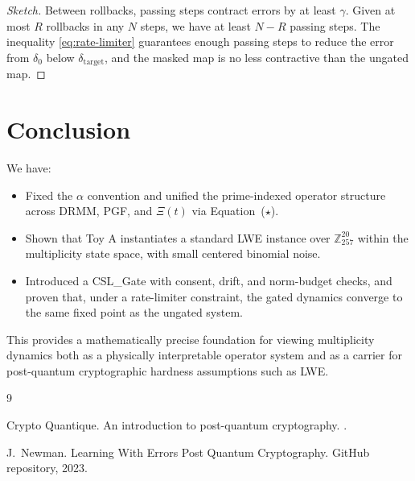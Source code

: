 \documentclass[11pt]{article}
\begin{document}
\begin{proof}[Sketch]
Between rollbacks, passing steps contract errors by at least $\gamma$. Given at
most $R$ rollbacks in any $N$ steps, we have at least $N-R$ passing steps. The
inequality \eqref{eq:rate-limiter} guarantees enough passing steps to reduce
the error from $\delta_0$ below $\delta_{\mathrm{target}}$, and the masked map
is no less contractive than the ungated map.
\end{proof}

\section{Conclusion}

We have:

\begin{itemize}
    \item Fixed the $\alpha$ convention and unified the prime-indexed operator
    structure across DRMM, PGF, and $\Xi(t)$ via Equation~($\star$).
    \item Shown that Toy A instantiates a standard LWE instance over
    $\mathbb{Z}_{257}^{20}$ within the multiplicity state space, with small
    centered binomial noise.
    \item Introduced a CSL\_Gate with consent, drift, and norm-budget checks,
    and proven that, under a rate-limiter constraint, the gated dynamics converge
    to the same fixed point as the ungated system.
\end{itemize}

This provides a mathematically precise foundation for viewing multiplicity
dynamics both as a physically interpretable operator system and as a carrier
for post-quantum cryptographic hardness assumptions such as LWE.


\begin{thebibliography}{9}

Crypto Quantique.
\newblock An introduction to post-quantum cryptography.
.

J.~Newman.
\newblock Learning With Errors Post Quantum Cryptography.
\newblock GitHub repository, 2023.

\end{thebibliography}
\end{document}

